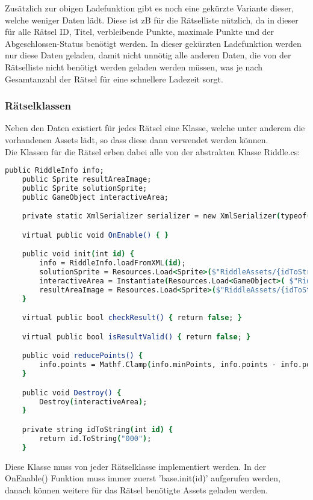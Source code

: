Zusätzlich zur obigen Ladefunktion gibt es noch eine gekürzte Variante dieser, welche weniger Daten lädt. Diese ist zB für die Rätselliste nützlich, da in dieser für alle Rätsel ID, Titel, verbleibende Punkte, maximale Punkte und der Abgeschlossen-Status benötigt werden. In dieser gekürzten Ladefunktion werden nur diese Daten geladen, damit nicht unnötig alle anderen Daten, die von der Rätselliste nicht benötigt werden geladen werden müssen, was je nach Gesamtanzahl der Rätsel für eine schnellere Ladezeit sorgt.

\subsubsection{Rätselklassen}
Neben den Daten existiert für jedes Rätsel eine Klasse, welche unter anderem die vorhandenen Assets lädt, so dass diese dann verwendet werden können.\\
Die Klassen für die Rätsel erben dabei alle von der abstrakten Klasse Riddle.cs:
\begin{lstlisting}[language=csh, caption={Riddle.cs base Klasse}]
	public RiddleInfo info;
    public Sprite resultAreaImage;
    public Sprite solutionSprite;
    public GameObject interactiveArea;

    private static XmlSerializer serializer = new XmlSerializer(typeof(RiddleInfo));

    virtual public void OnEnable() { }

    public void init(int id) {
        info = RiddleInfo.loadFromXML(id);
        solutionSprite = Resources.Load<Sprite>($"RiddleAssets/{idToString(id)}/solution") as Sprite;
        interactiveArea = Instantiate(Resources.Load<GameObject>( $"RiddleAssets/{idToString(id)}/R{idToString(id)}")) as GameObject;
        resultAreaImage = Resources.Load<Sprite>($"RiddleAssets/{idToString(id)}/result") as Sprite;
    }

    virtual public bool checkResult() { return false; }

    virtual public bool isResultValid() { return false; }

    public void reducePoints() {
        info.points = Mathf.Clamp(info.minPoints, info.points - info.pointReduction, info.maxPoints);
    }

    public void Destroy() {
        Destroy(interactiveArea);
    }

    private string idToString(int id) {
        return id.ToString("000");
    }
\end{lstlisting}
Diese Klasse muss von jeder Rätselklasse implementiert werden. In der OnEnable() Funktion muss immer zuerst 'base.init(id)' aufgerufen werden, danach können weitere für das Rätsel benötigte Assets geladen werden.\\

